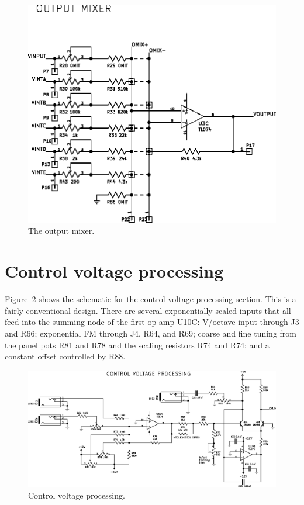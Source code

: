 \begin{figure}
\centering\includegraphics[width=\linewidth]{outmixer}\par
\caption{The output mixer.}\label{fig:outmixer}
\end{figure}


\section{Control voltage processing}

Figure~\ref{fig:cvproc} shows the schematic for the control voltage
processing section.  This is a fairly conventional design.  There are
several exponentially-scaled inputs that all feed into the summing node of
the first op amp U10C:  V/octave input through J3 and R66; exponential FM
through J4, R64, and R69; coarse and fine tuning from the panel pots R81 and
R78 and the scaling resistors R74 and R74; and a constant offset controlled
by R88.

\begin{figure}
\centering\includegraphics[width=\linewidth]{cvproc}\par
\caption{Control voltage processing.}\label{fig:cvproc}
\end{figure}

